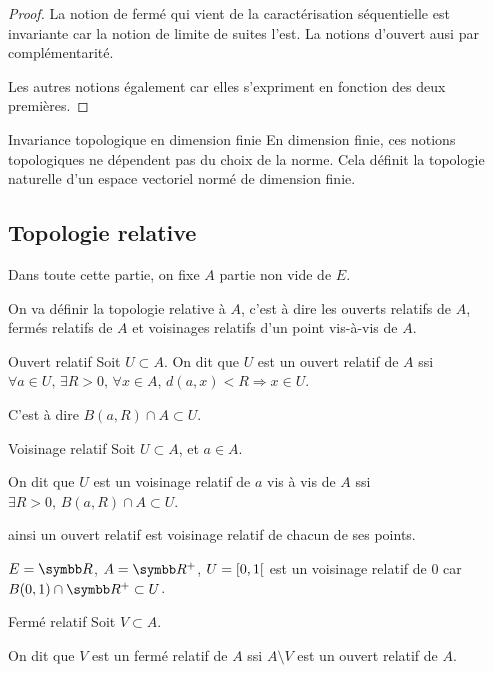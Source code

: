 \begin{proof}
    La notion de fermé qui vient de la caractérisation séquentielle est invariante car la notion de 
    limite de suites l'est. 
    La notions d'ouvert ausi par complémentarité. 

    Les autres notions également car elles s'expriment en fonction des deux premières.
\end{proof}


\begin{corollaire}{Invariance topologique en dimension finie}{}
    En dimension finie, ces notions topologiques ne dépendent pas du choix de la norme. Cela définit la topologie naturelle d'un espace vectoriel normé de dimension finie.
\end{corollaire}

\subsection{Topologie relative}

Dans toute cette partie, on fixe $A$ partie non vide de $E$.

On va définir la topologie relative à $A$, c'est à dire les ouverts relatifs de $A$, fermés relatifs de $A$ et voisinages relatifs d'un point vis-à-vis de $A$.

\begin{definition}{Ouvert relatif}{}
    Soit $U \subset A$. On dit que $U$ est un ouvert relatif de $A$ 
    ssi $\forall a \in U, \, \exists R > 0, \, \forall x \in A, \, d(a, x) < R \Rightarrow x \in U$.

    C'est à dire $B(a, R) \cap A \subset U$.
\end{definition}

\begin{definition}{Voisinage relatif}{}
    Soit $U \subset A$, et $a \in A$. 

    On dit que $U$ est un voisinage relatif de $a$ vis à vis de $A$ ssi 
    $\exists R > 0, \, B(a, R) \cap A \subset U$.

    ainsi un ouvert relatif est voisinage relatif de chacun de ses points.
\end{definition}

\begin{exemple}
    $E = \R$, $A = \R^+$, $U = \left[0, 1\right[$ est un voisinage relatif de $0$ 
    car $B(0, 1) \cap \R^+ \subset U$. 
\end{exemple}

\begin{definition}{Fermé relatif}{}
    Soit $V \subset A$. 

    On dit que $V$ est un fermé relatif de $A$ ssi $A \setminus V$ est un ouvert relatif de $A$.
\end{definition}

